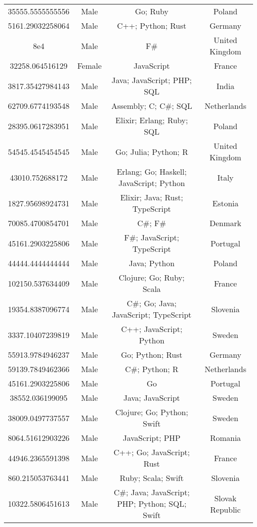 \begin{center}
\begin{tabular}{ |c|c|c|c| }
35555.5555555556  &  Male  &  Go; Ruby  &  Poland  \\ 
5161.29032258064  &  Male  &  C++; Python; Rust  &  Germany  \\ 
8e4  &  Male  &  F\#  &  United Kingdom  \\ 
32258.064516129  &  Female  &  JavaScript  &  France  \\ 
3817.35427984143  &  Male  &  Java; JavaScript; PHP; SQL  &  India  \\ 
62709.6774193548  &  Male  &  Assembly; C; C\#; SQL  &  Netherlands  \\ 
28395.0617283951  &  Male  &  Elixir; Erlang; Ruby; SQL  &  Poland  \\ 
54545.4545454545  &  Male  &  Go; Julia; Python; R  &  United Kingdom  \\ 
43010.752688172  &  Male  &  Erlang; Go; Haskell; JavaScript; Python  &  Italy  \\ 
1827.95698924731  &  Male  &  Elixir; Java; Rust; TypeScript  &  Estonia  \\ 
70085.4700854701  &  Male  &  C\#; F\#  &  Denmark  \\ 
45161.2903225806  &  Male  &  F\#; JavaScript; TypeScript  &  Portugal  \\ 
44444.4444444444  &  Male  &  Java; Python  &  Poland  \\ 
102150.537634409  &  Male  &  Clojure; Go; Ruby; Scala  &  France  \\ 
19354.8387096774  &  Male  &  C\#; Go; Java; JavaScript; TypeScript  &  Slovenia  \\ 
3337.10407239819  &  Male  &  C++; JavaScript; Python  &  Sweden  \\ 
55913.9784946237  &  Male  &  Go; Python; Rust  &  Germany  \\ 
59139.7849462366  &  Male  &  C\#; Python; R  &  Netherlands  \\ 
45161.2903225806  &  Male  &  Go  &  Portugal  \\ 
38552.036199095  &  Male  &  Java; JavaScript  &  Sweden  \\ 
38009.0497737557  &  Male  &  Clojure; Go; Python; Swift  &  Sweden  \\ 
8064.51612903226  &  Male  &  JavaScript; PHP  &  Romania  \\ 
44946.2365591398  &  Male  &  C++; Go; JavaScript; Rust  &  France  \\ 
860.215053763441  &  Male  &  Ruby; Scala; Swift  &  Slovenia  \\ 
10322.5806451613  &  Male  &  C\#; Java; JavaScript; PHP; Python; SQL; Swift  &  Slovak Republic  \\ 

\end{tabular}
\end{center}
